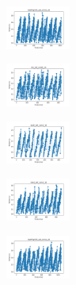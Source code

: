 \begin{figure}[H]
\begin{subfigure}
    \end{subfigure}
    \hfill
    \begin{subfigure}
        \centering
        \includegraphics[width=0.234\textwidth]{img/bmb/newthyroid_set_const_10_277451237_time.png}
    \end{subfigure}
    \hfill
    \begin{subfigure}
        \centering
        \includegraphics[width=0.234\textwidth]{img/bmb/iris_set_const_10_49258669_time.png}
    \end{subfigure}
    \hfill
    \begin{subfigure}
        \centering
        \includegraphics[width=0.234\textwidth]{img/bmb/ecoli_set_const_10_49258669_time.png}
    \end{subfigure}
    \hfill
    \begin{subfigure}
        \centering
        \includegraphics[width=0.234\textwidth]{img/bmb/rand_set_const_10_49258669_time.png}
    \end{subfigure}
    \hfill
    \begin{subfigure}
        \centering
        \includegraphics[width=0.234\textwidth]{img/bmb/newthyroid_set_const_10_49258669_time.png}
    \end{subfigure}
    \hfill
    \begin{subfigure}

\end{subfigure}
\end{figure}
